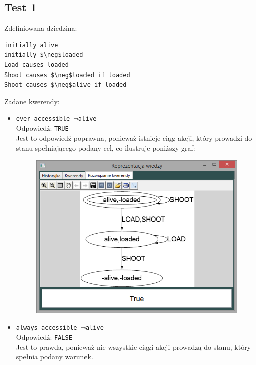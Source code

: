 \documentclass{article}
\begin{document}
\subsection{Test 1}
Zdefiniowana dziedzina:
\bigskip
{}
\begin{lstlisting}[mathescape=true]
initially alive
initially $\neg$loaded
Load causes loaded
Shoot causes $\neg$loaded if loaded
Shoot causes $\neg$alive if loaded
\end{lstlisting}
Zadane kwerendy:
\begin{itemize}
    \item {\large\texttt{ever accessible $\neg$alive}}\\
    Odpowiedź: \texttt{TRUE}\\
    Jest to odpowiedź poprawna, ponieważ istnieje ciąg akcji, który prowadzi do stanu spełniającego podany cel, co ilustruje poniższy graf:
    \begin{figure}[H]
    \centering
    \includegraphics[scale=0.5]{test1_1}
    \end{figure}
    \item {\large\texttt{always accessible $\neg$alive}}\\
    Odpowiedź: \texttt{FALSE}\\
    Jest to prawda, ponieważ nie wszystkie ciągi akcji prowadzą do stanu, który spełnia podany warunek.
    \begin{figure}[H]
    \centering

\end{figure}
\end{itemize}
\end{document}

